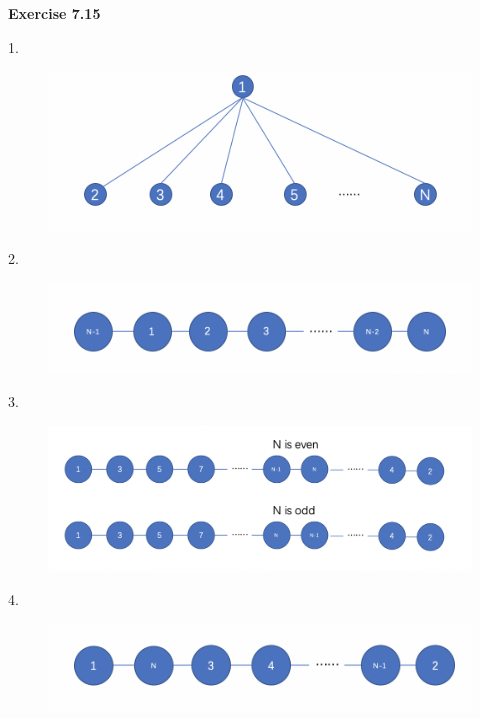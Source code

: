 \documentclass{article} %
\begin{document}
	\textbf{Exercise 7.15}\par
	1.\par
  	\begin{figure}[H]
  	\centering
  	\includegraphics[scale=0.6]{7.15.1.png}
  	\caption{}
  	\label{}
  	\end{figure}
	2.\par
  	\begin{figure}[H]
  	\centering
  	\includegraphics[scale=0.6]{7.15.2.png}
  	\caption{}
  	\label{}
  	\end{figure}
	3.\par
  	\begin{figure}[H]
  	\centering
  	\includegraphics[scale=0.6]{7.15.3.png}
  	\caption{}
  	\label{}
  	\end{figure}
	4.\par
  	\begin{figure}[H]
  	\centering
  	\includegraphics[scale=0.6]{7.15.4.png}
  	\caption{}
  	\label{}
  	\end{figure}
\end{document}
